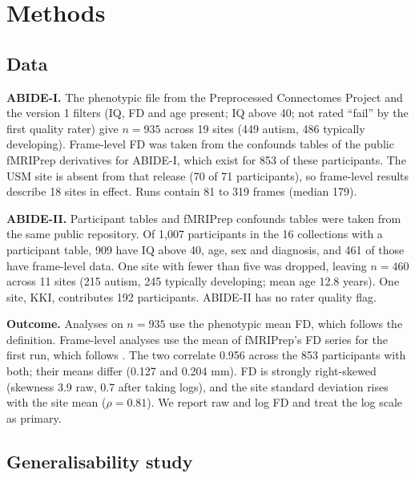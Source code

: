 \documentclass[11pt,a4paper]{article}
\begin{document}
\section{Methods}

\subsection{Data}

\textbf{ABIDE-I.} The phenotypic file from the Preprocessed Connectomes Project and the version 1 filters (IQ, FD and age present; IQ above 40; not rated ``fail'' by the first quality rater) give $n = 935$ across 19 sites (449 autism, 486 typically developing). Frame-level FD was taken from the confounds tables of the public fMRIPrep \citep{Esteban2019} derivatives for ABIDE-I, which exist for 853 of these participants. The USM site is absent from that release (70 of 71 participants), so frame-level results describe 18 sites in effect. Runs contain 81 to 319 frames (median 179).

\textbf{ABIDE-II.} Participant tables and fMRIPrep confounds tables were taken from the same public repository. Of 1,007 participants in the 16 collections with a participant table, 909 have IQ above 40, age, sex and diagnosis, and 461 of those have frame-level data. One site with fewer than five was dropped, leaving $n = 460$ across 11 sites (215 autism, 245 typically developing; mean age 12.8 years). One site, KKI, contributes 192 participants. ABIDE-II has no rater quality flag.

\textbf{Outcome.} Analyses on $n = 935$ use the phenotypic mean FD, which follows the \citet{Jenkinson2002} definition. Frame-level analyses use the mean of fMRIPrep's FD series for the first run, which follows \citet{Power2012}. The two correlate 0.956 across the 853 participants with both; their means differ (0.127 and 0.204 mm). FD is strongly right-skewed (skewness 3.9 raw, 0.7 after taking logs), and the site standard deviation rises with the site mean ($\rho = 0.81$). We report raw and log FD and treat the log scale as primary.

\subsection{Generalisability study}
\end{document}
